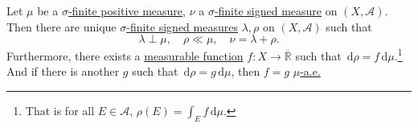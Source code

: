 \begin{theorem}\label{thm:Lebesgue-Radon-Nikodym}
	Let \(\mu\) be a \hyperref[def:finite-signed-measure]{\(\sigma\)-finite positive measure}, \(\nu\) a \hyperref[def:finite-signed-measure]{\(\sigma\)-finite signed measure} on \((X, \mathcal{A})\). Then there are unique \hyperref[def:finite-signed-measure]{\(\sigma\)-finite signed measures} \(\lambda,\rho\) on \((X, \mathcal{A})\) such that
	\[
		\lambda \perp \mu, \quad \rho \ll \mu, \quad \nu = \lambda + \rho.
	\]
	Furthermore, there exists a \hyperref[def:measurable-function]{measurable function} \(f \colon X \to \overline{\mathbb{R}}\) such that \(\,\mathrm{d} \rho = f \,\mathrm{d} \mu\).\footnote{That is for all \(E \in \mathcal{A}\), \(\rho(E) = \int_E f \,\mathrm{d} \mu\).} And if there is another \(g\) such that \(\,\mathrm{d} \rho = g \,\mathrm{d} \mu\), then \(f = g\) \hyperref[def:mu-almost-everywhere]{\(\mu\)-a.e.}
\end{theorem}
